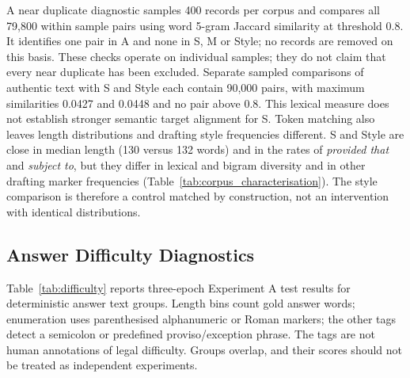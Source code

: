 \documentclass[pdflatex,sn-basic]{sn-jnl}
\begin{document}
A near duplicate diagnostic samples 400 records per corpus and compares all
79,800 within sample pairs using word 5-gram Jaccard similarity at threshold
0.8. It identifies one pair in A and none in S, M or Style; no records are
removed on this basis. These checks operate on individual samples; they do not claim that every
near duplicate has been excluded. Separate sampled comparisons of authentic
text with S and Style each contain 90,000 pairs, with maximum
similarities 0.0427 and 0.0448 and no pair above 0.8.
This lexical measure does not establish stronger semantic target alignment
for S. Token matching also leaves length distributions and drafting style
frequencies different.
S and Style are close in median length (130 versus 132 words) and in the rates
of \emph{provided that} and \emph{subject to}, but they differ in lexical and
bigram diversity and in other drafting marker frequencies
(Table~\ref{tab:corpus_characterisation}). The style comparison is therefore a
control matched by construction, not an intervention with identical distributions.

\subsection{Answer Difficulty Diagnostics}\label{sec:difficulty}

Table~\ref{tab:difficulty} reports three-epoch Experiment A test results for
deterministic answer text groups. Length bins count gold answer words; enumeration uses
parenthesised alphanumeric or Roman markers; the other tags detect a
semicolon or predefined proviso/exception phrase. The tags are not
human annotations of legal difficulty. Groups overlap, and their scores
should not be treated as independent experiments.
\end{document}
